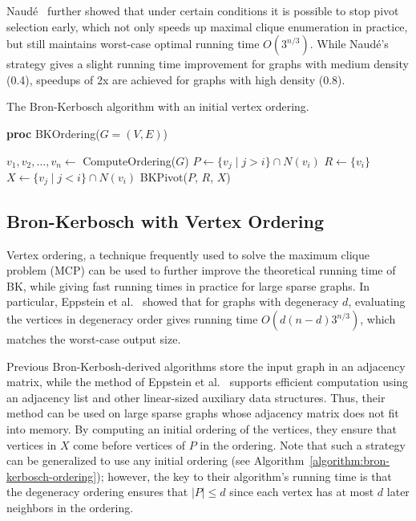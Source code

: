 \documentclass[final,1p]{elsarticle-modified}
\begin{document}
Naud\'e~\cite{naude-2016} further showed that under certain conditions it is possible to stop pivot selection early, which not only speeds up maximal clique enumeration in practice, but still maintains worst-case optimal running time $O(3^{n/3})$. While Naud\'e's strategy gives a slight running time improvement for graphs with medium density (0.4), speedups of 2x are achieved for graphs with high density (0.8).

\begin{algorithm}[!htb]
\caption{The Bron-Kerbosch algorithm with an initial vertex ordering.}
\label{algorithm:bron-kerbosch-ordering}
{\bf proc} BKOrdering($G=(V,E)$)
\begin{algorithmic}[1]
\State $v_1,v_2,\ldots,v_n \leftarrow $ ComputeOrdering($G$) 
    \State $P \leftarrow \{v_j\mid j > i\} \cap N(v_i)$
    \State $R \leftarrow \{v_i\}$
    \State $X \leftarrow \{v_j\mid j < i\} \cap N(v_i)$
    \State BKPivot($P$, $R$, $X$)
\EndFor
\end{algorithmic}
\end{algorithm}


\subsection{Bron-Kerbosch with Vertex Ordering}
Vertex ordering, a technique frequently used to solve the maximum clique problem (MCP) can be used to further improve the theoretical running time of BK, while giving fast running times in practice for large sparse graphs. In particular, Eppstein et al.~\cite{els-2013} showed that for graphs with degeneracy $d$, evaluating the vertices in degeneracy order gives running time $O(d(n-d)3^{n/3})$, which matches the worst-case output size.

Previous Bron-Kerbosh-derived algorithms store the input graph in an adjacency matrix, while the method of Eppstein et al.~\cite{els-2013} supports efficient computation using an adjacency list and other linear-sized auxiliary data structures. Thus, their method can be used on large sparse graphs whose adjacency matrix does not fit into memory. By computing an initial ordering of the vertices, they ensure that vertices in $X$ come before vertices of $P$ in the ordering. Note that such a strategy can be generalized to use any initial ordering (see Algorithm~\ref{algorithm:bron-kerbosch-ordering}); however, the key to their algorithm's running time is that the degeneracy ordering ensures that $|P|\leq d$ since each vertex has at most $d$ later neighbors in the ordering.
\end{document}
